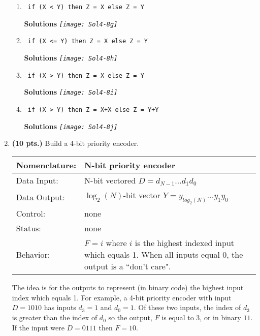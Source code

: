 \begin{enumerate}
\begin{enumerate}
\item \verb^ if (X < Y) then Z = X else Z = Y ^

\begin{onlysolution} \textbf{Solutions} \itshape{
\texttt{[image: Sol4-8g]}
} \end{onlysolution} 

\item \verb^ if (X <= Y) then Z = X else Z = Y ^

\begin{onlysolution} \textbf{Solutions} \itshape{
\texttt{[image: Sol4-8h]}
} \end{onlysolution} 

\item \verb^ if (X > Y) then Z = X else Z = Y ^

\begin{onlysolution} \textbf{Solutions} \itshape{
\texttt{[image: Sol4-8i]}
} \end{onlysolution} 

\item \verb^ if (X > Y) then Z = X+X else Z = Y+Y ^

\begin{onlysolution} \textbf{Solutions} \itshape{
\texttt{[image: Sol4-8j]}
} \end{onlysolution} 

\end{enumerate}

\item \textbf{ (10 pts.)} Build a 4-bit priority encoder.

\begin{tabular}{|l|p{3.5in}|} \hline
Nomenclature:  & N-bit priority encoder                \\ \hline
Data Input:    & N-bit vectored  $D=d_{N-1} \ldots d_1 d_0$  \\ \hline
Data Output:   & $\log_2(N)$-bit vector $Y=y_{log_2(N)} \ldots y_1 y_0$    \\ \hline
Control:       & none					\\ \hline
Status:        & none                                   \\ \hline
Behavior:      & $F = i$ where $i$ is the highest indexed input
			which equals 1.  When all inputs equal
			0, the output is a ``don't care".  \\ \hline
\end{tabular}
\label{page:prior}

The idea is for the outputs to represent (in binary code) the highest
input index which equals 1.  For example, a 4-bit priority encoder
with input $D=1010$ has inputs $d_3=1$ and $d_0=1$.  Of these two
inputs, the index of $d_3$ is greater than the index of $d_0$ so the
output, $F$ is equal to 3, or in binary $11$.  If the input were
$D=0111$ then $F=10$.


\end{enumerate}
